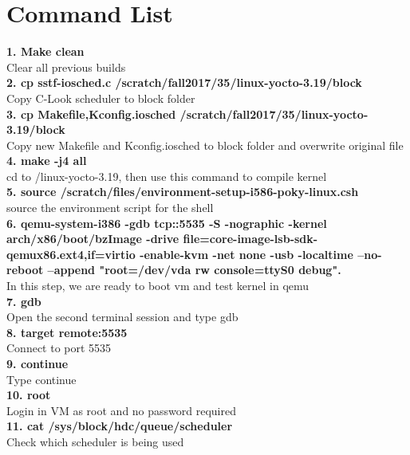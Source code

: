 \documentclass[10pt,letterpaper]{article}
\begin{document}
\section*{Command List}

\textbf{}

\textbf{1. Make clean}\\
Clear all previous builds\\

\textbf{2. cp sstf-iosched.c /scratch/fall2017/35/linux-yocto-3.19/block}\\
Copy C-Look scheduler to block folder\\

\textbf{3. cp {Makefile,Kconfig.iosched} /scratch/fall2017/35/linux-yocto-3.19/block}\\
Copy new Makefile and Kconfig.iosched to block folder and overwrite original file\\

\textbf{4. make -j4 all}\\
cd to /linux-yocto-3.19, then use this command to compile kernel\\

\textbf{5. source /scratch/files/environment-setup-i586-poky-linux.csh}\\
source the environment script for the shell\\

\textbf{6. qemu-system-i386 -gdb tcp::5535 -S -nographic -kernel arch/x86/boot/bzImage -drive file=core-image-lsb-sdk-qemux86.ext4,if=virtio -enable-kvm -net none -usb -localtime --no-reboot --append "root=/dev/vda rw console=ttyS0 debug".}\\
In this step, we are ready to boot vm and test kernel in qemu\\

\textbf{7. gdb}\\
Open the second terminal session and type gdb\\

\textbf{8. target remote:5535}\\
Connect to port 5535\\

\textbf{9. continue}\\
Type continue\\

\textbf{10. root}\\
Login in VM as root and no password required\\

\textbf{11. cat /sys/block/hdc/queue/scheduler}\\
Check which scheduler is being used\\
\end{document}
